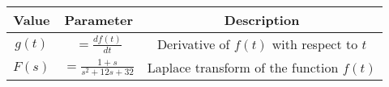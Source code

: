 
\begin{tabular}{|c|c|c|}
\hline
\textbf{Value} & \textbf{Parameter} & \textbf{Description} \\
\hline
$g(t)$ & $=\frac{df(t)}{dt}$ & Derivative of $f(t)$ with respect to $t$ \\
\hline
$F(s)$ & $=\frac{1+s}{s^2+12s+32}$ & Laplace transform of the function $f(t)$ \\
\hline

\end{tabular}


